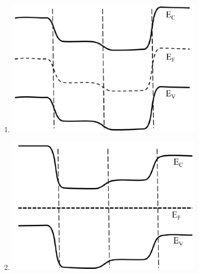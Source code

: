 \documentclass[a4paper, 11pt]{article}
\begin{document}
\begin{enumerate}
\begin{enumerate}
            \item \includegraphics[width=0.9\columnwidth]{figs/q8C.png}
            \item \includegraphics[width=0.9\columnwidth]{figs/q8D.png}
    \end{enumerate}
    
    \hfill{}


\end{enumerate}
\end{document}

